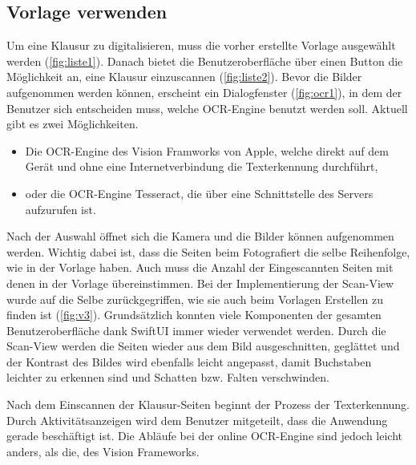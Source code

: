 \documentclass[nomenclature, oneside, 150]{HSMW-Thesis}
\begin{document}
		\subsection{Vorlage verwenden}
			Um eine Klausur zu digitalisieren, muss die vorher erstellte Vorlage ausgewählt werden (\ref{fig:liste1}). Danach bietet die Benutzeroberfläche über einen Button die Möglichkeit an, eine Klausur einzuscannen (\ref{fig:liste2}). Bevor die Bilder aufgenommen werden können, erscheint ein Dialogfenster (\ref{fig:ocr1}), in dem der Benutzer sich entscheiden muss, welche OCR-Engine benutzt werden soll. Aktuell gibt es zwei Möglichkeiten.
				\begin{itemize}
					\item Die OCR-Engine des Vision Framworks von Apple, welche direkt auf dem Gerät und ohne eine Internetverbindung die Texterkennung durchführt,  
					\item oder die OCR-Engine Tesseract, die über eine Schnittstelle des Servers aufzurufen ist.
				\end{itemize}
			
			 Nach der Auswahl öffnet sich die Kamera und die Bilder können aufgenommen werden. Wichtig dabei ist, dass die Seiten beim Fotografiert die selbe Reihenfolge, wie in der Vorlage haben. Auch muss die Anzahl der Eingescannten Seiten mit denen in der Vorlage übereinstimmen. Bei der Implementierung der Scan-View wurde auf die Selbe zurückgegriffen, wie sie auch beim Vorlagen Erstellen zu finden ist (\ref{fig:v3}). Grundsätzlich konnten viele Komponenten der gesamten Benutzeroberfläche dank SwiftUI immer wieder verwendet werden. Durch die Scan-View werden die Seiten wieder aus dem Bild ausgeschnitten, geglättet und der Kontrast des Bildes wird ebenfalls leicht angepasst, damit Buchstaben leichter zu erkennen sind und Schatten bzw. Falten verschwinden.
			
			Nach dem Einscannen der Klausur-Seiten beginnt der Prozess der Texterkennung. Durch Aktivitätsanzeigen wird dem Benutzer mitgeteilt, dass die Anwendung gerade beschäftigt ist. Die Abläufe bei der online OCR-Engine sind jedoch leicht anders, als die, des Vision Frameworks.
			
\end{document}
